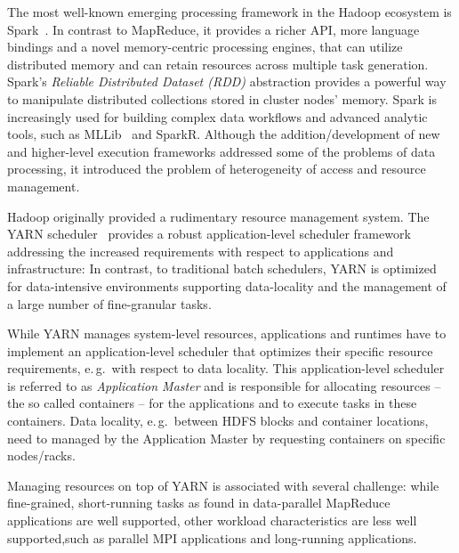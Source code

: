 The most well-known emerging processing framework in the Hadoop ecosystem is Spark~\cite{zaharia2010spark}.
In contrast to MapReduce, it provides a richer API, more language bindings and a novel memory-centric processing engines, that can utilize distributed memory and can retain resources across multiple task generation.
Spark's \emph{Reliable Distributed Dataset (RDD)} abstraction provides a powerful way to manipulate distributed collections stored in cluster nodes' memory.
Spark is increasingly used for building complex data workflows and advanced analytic tools, such as MLLib~\cite{mllib} and SparkR.
Although the addition/development of new and higher-level execution frameworks addressed some of the problems of data processing, it introduced the problem of heterogeneity of access and resource management.

Hadoop originally provided a rudimentary resource management system.
The YARN scheduler~\cite{vavilapalli2013apache} provides a robust application-level scheduler framework addressing the increased requirements with respect to applications and infrastructure: 
In contrast, to traditional batch schedulers, YARN is optimized for data-intensive environments supporting data-locality and the management of a large number of fine-granular tasks.

While YARN manages system-level resources, applications and runtimes have to implement an application-level scheduler that optimizes their specific resource requirements, e.\,g.\ with respect to data locality. This application-level scheduler is referred to as {\it Application Master} and is responsible for allocating resources -- the so called containers -- for the applications and to execute tasks in these containers.
Data locality, e.\,g.\ between HDFS blocks and container locations, need to managed by the Application Master by requesting containers on specific nodes/racks.

Managing resources on top of YARN is associated with several challenge: while fine-grained, short-running tasks as found in data-parallel MapReduce applications are well supported, other workload characteristics are less well supported,such as parallel MPI applications and long-running applications.

